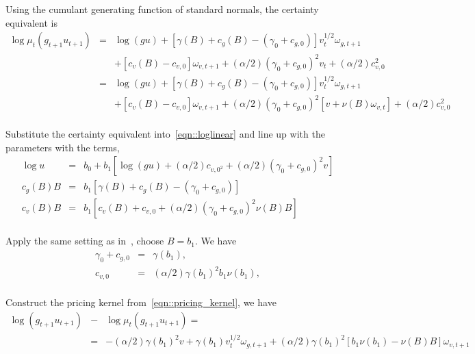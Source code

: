\documentclass[11pt,reqno,final]{amsart}
\begin{document}
Using the cumulant generating function of standard normals, the certainty equivalent is
\begin{eqnarray*}
\log \mu_t(g_{t+1}u_{t+1}) &=& \log(gu) + [\gamma(B)+c_g(B)-(\gamma_0+c_{g,0})] v_t^{1/2} \omega_{g,t+1} \\
 & & + [c_v(B)-c_{v,0}] \omega_{v,t+1} + (\alpha/2)(\gamma_0+c_{g,0})^2 v_t + (\alpha/2)c_{v,0}^2 \\
&=& \log(gu) + [\gamma(B)+c_g(B)-(\gamma_0+c_{g,0})] v_t^{1/2} \omega_{g,t+1} \\
 & & + [c_v(B)-c_{v,0}] \omega_{v,t+1} + (\alpha/2)(\gamma_0+c_{g,0})^2 [v+\nu(B)\omega_{v,t}] + (\alpha/2)c_{v,0}^2  \\
\end{eqnarray*}

Substitute the certainty equivalent into~\ref{eqn::loglinear} and line up with the parameters with the terms,
\begin{eqnarray*}
\log u &=& b_0 + b_1 [\log(gu)+(\alpha/2)c_{v,0^2} +(\alpha/2)(\gamma_0+c_{g,0})^2v] \\
c_g(B)B &=& b_1 [\gamma(B)+c_g(B)-(\gamma_0+c_{g,0})] \\
c_v(B)B &=& b_1 [c_v(B)+c_{v,0}+(\alpha/2)(\gamma_0+c_{g,0})^2 \nu(B)B] \\
\end{eqnarray*}

Apply the same setting as in~\cite{BCZ14}, choose $B = b_1$. We have
\begin{eqnarray*}
\gamma_0 + c_{g,0} &=& \gamma(b_1), \\
c_{v,0} &=& (\alpha/2)\gamma(b_1)^2 b_1\nu(b_1), \\
\end{eqnarray*}

Construct the pricing kernel from~\ref{eqn::pricing_kernel}, we have
\begin{eqnarray*}
\log (g_{t+1}u_{t+1}) &-& \log \mu_t(g_{t+1}u_{t+1}) = \\
    &=& -(\alpha/2)\gamma(b_1)^2 v + \gamma(b_1)v_t^{1/2}\omega_{g,t+1} + (\alpha/2)\gamma(b_1)^2[b_1\nu(b_1)-\nu(B)B]\omega_{v,t+1} \\
\end{eqnarray*}
\end{document}
